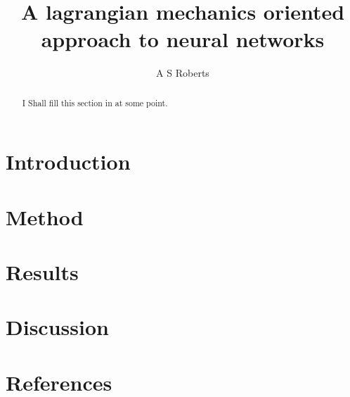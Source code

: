 \documentclass[10pt]{iopart}
\begin{document}
	\title[A lagrangian mechanics oriented approach to neural networks]{A lagrangian mechanics oriented approach to neural networks}
	\author{A S Roberts}
	\address{Department of Physics, University of Bath, Claverton Down, Bath BA2 7AY, United Kingdom}
	
\begin{abstract}
I Shall fill this section in at some point.
\end{abstract}
\maketitle
\ioptwocol
\section{Introduction}
\section{Method}
\section{Results}
\section{Discussion}
\cite{Nobody06}
\ack
\section*{References}


\end{document}
